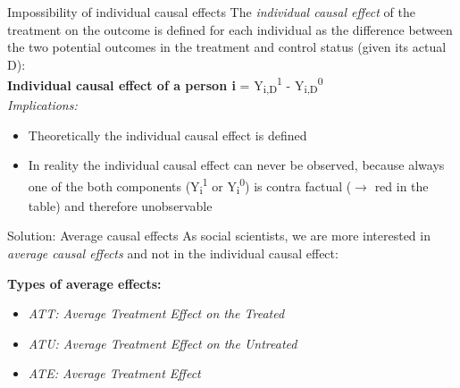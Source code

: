 \documentclass{beamer}\usepackage[]{graphicx}\usepackage[]{color}
\begin{document}
\begin{frame}{Impossibility of individual causal effects}
The \textit{individual causal effect} of the treatment on the outcome is defined for each individual as the difference between the two potential outcomes in the treatment and control status (given its actual D):\\
\textbf{Individual causal effect of a person i} = Y\textsubscript{i,D}\textsuperscript{1} - Y\textsubscript{i,D}\textsuperscript{0} \\[1em]
\textit{Implications:} 
  \begin{itemize}
    \item Theoretically the individual causal effect is defined
    \item In reality the individual causal effect can never be observed, because always one of the both components (Y\textsubscript{i}\textsuperscript{1} or Y\textsubscript{i}\textsuperscript{0}) is contra factual ($\rightarrow$ red in the table) and therefore unobservable
  \end{itemize}
\end{frame}


\begin{frame}{Solution: Average causal effects}
As social scientists, we are more interested in \textit{average causal effects} and not in the individual causal effect:

\textbf{Types of average effects:}
  \begin{itemize}
    \item \textit{ATT: Average Treatment Effect on the Treated}
    \item \textit{ATU: Average Treatment Effect on the Untreated}
    \item \textit{ATE: Average Treatment Effect}
  \end{itemize}

\end{frame}
\end{document}
